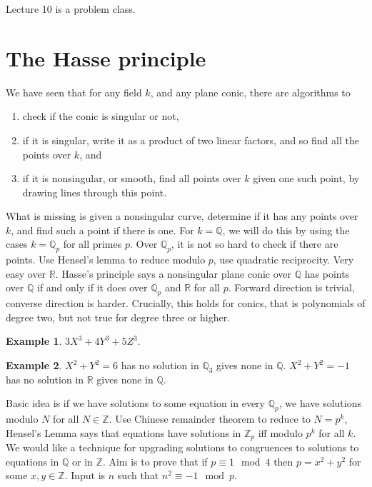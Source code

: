 \documentclass{article}
\newcommand{\Z}{\mathbb{Z}}
\newcommand{\Q}{\mathbb{Q}}
\newcommand{\R}{\mathbb{R}}
\theoremstyle{definition}\newtheorem{definition}{Definition}[section]
\theoremstyle{definition}\newtheorem{remark}[definition]{Remark}
\theoremstyle{definition}\newtheorem*{example}{Example}
\theoremstyle{definition}\newtheorem*{note}{Note}
\begin{document}
Lecture 10 is a problem class.


\section{The Hasse principle}

We have seen that for any field $ k $, and any plane conic, there are algorithms to
\begin{enumerate}
\item check if the conic is singular or not,
\item if it is singular, write it as a product of two linear factors, and so find all the points over $ k $, and
\item if it is nonsingular, or smooth, find all points over $ k $ given one such point, by drawing lines through this point.
\end{enumerate}
What is missing is given a nonsingular curve, determine if it has any points over $ k $, and find such a point if there is one. For $ k = \Q $, we will do this by using the cases $ k = \Q_p $ for all primes $ p $. Over $ \Q_p $, it is not so hard to check if there are points. Use Hensel's lemma to reduce modulo $ p $, use quadratic reciprocity. Very easy over $ \R $. Hasse's principle says a nonsingular plane conic over $ \Q $ has points over $ \Q $ if and only if it does over $ \Q_p $ and $ \R $ for all $ p $. Forward direction is trivial, converse direction is harder. Crucially, this holds for conics, that is polynomials of degree two, but not true for degree three or higher.

\begin{example}
$ 3X^3 + 4Y^3 + 5Z^3 $.
\end{example}

\begin{example}
$ X^2 + Y^2 = 6 $ has no solution in $ \Q_3 $ gives none in $ \Q $. $ X^2 + Y^2 = -1 $ has no solution in $ \R $ gives none in $ \Q $.
\end{example}

Basic idea is if we have solutions to some equation in every $ \Q_p $, we have solutions modulo $ N $ for all $ N \in \Z $. Use Chinese remainder theorem to reduce to $ N = p^k $, Hensel's Lemma says that equations have solutions in $ \Z_p $ iff modulo $ p^k $ for all $ k $. We would like a technique for upgrading solutions to congruences to solutions to equations in $ \Q $ or in $ \Z $. Aim is to prove that if $ p \equiv 1 \mod 4 $ then $ p = x^2 + y^2 $ for some $ x, y \in \Z $. Input is $ n $ such that $ n^2 \equiv -1 \mod p $.
\end{document}
